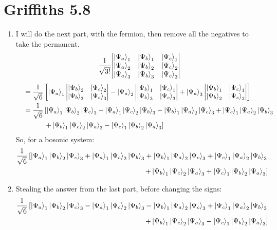 \documentclass[11pt]{article}
\begin{document}
\newpage

\section*{Griffiths 5.8}
\begin{enumerate}[label=\alph*)]
\addtocounter{enumi}{1}
\item I will do the next part, with the fermion, then remove all the negatives to take the permanent.
\[\frac{1}{\sqrt{3!}}\mqty|\ket{\Psi_a}_1 & \ket{\Psi_b}_1 & \ket{\Psi_c}_1 \\ \ket{\Psi_a}_2 & \ket{\Psi_b}_2 & \ket{\Psi_c}_2 \\ \ket{\Psi_a}_3 & \ket{\Psi_b}_3 & \ket{\Psi_c}_3|\]
\begin{align*}
\quad & = \frac{1}{\sqrt{6}}\left[\ket{\Psi_a}_1 \mqty|\ket{\Psi_b}_2 & \ket{\Psi_c}_2 \\ \ket{\Psi_b}_3 & \ket{\Psi_c}_3| - \ket{\Psi_a}_2 \mqty|\ket{\Psi_b}_1 & \ket{\Psi_c}_1 \\ \ket{\Psi_b}_3 & \ket{\Psi_c}_3| + \ket{\Psi_a}_3 \mqty|\ket{\Psi_b}_1 & \ket{\Psi_c}_1 \\ \ket{\Psi_b}_2 & \ket{\Psi_c}_2|\right]\\
& = \frac{1}{\sqrt{6}}\left[\ket{\Psi_a}_1 \ket{\Psi_b}_2\ket{\Psi_c}_3 - \ket{\Psi_a}_1\ket{\Psi_c}_2\ket{\Psi_b}_3 - \ket{\Psi_b}_1\ket{\Psi_a}_2\ket{\Psi_c}_3 + \ket{\Psi_c}_1\ket{\Psi_a}_2\ket{\Psi_b}_3\right. \\
& \hspace{3em}\left.+ \ket{\Psi_b}_1\ket{\Psi_c}_2\ket{\Psi_a}_3 - \ket{\Psi_c}_1\ket{\Psi_b}_2\ket{\Psi_a}_3\right]
\end{align*}
So, for a bosonic system: 
\begin{align*}
\frac{1}{\sqrt{6}}\left[\ket{\Psi_a}_1 \ket{\Psi_b}_2\ket{\Psi_c}_3 + \ket{\Psi_a}_1\ket{\Psi_c}_2\ket{\Psi_b}_3 + \ket{\Psi_b}_1\ket{\Psi_a}_2\ket{\Psi_c}_3 + \ket{\Psi_c}_1\ket{\Psi_a}_2\ket{\Psi_b}_3\right. \\
\hspace{3em}\left.+ \ket{\Psi_b}_1\ket{\Psi_c}_2\ket{\Psi_a}_3 + \ket{\Psi_c}_1\ket{\Psi_b}_2\ket{\Psi_a}_3\right]
\end{align*}
\item Stealing the answer from the last part, before changing the signs:
\begin{align*}
 \frac{1}{\sqrt{6}}\left[\ket{\Psi_a}_1 \ket{\Psi_b}_2\ket{\Psi_c}_3 - \ket{\Psi_a}_1\ket{\Psi_c}_2\ket{\Psi_b}_3 - \ket{\Psi_b}_1\ket{\Psi_a}_2\ket{\Psi_c}_3 + \ket{\Psi_c}_1\ket{\Psi_a}_2\ket{\Psi_b}_3\right. \\
\hspace{3em}\left.+ \ket{\Psi_b}_1\ket{\Psi_c}_2\ket{\Psi_a}_3 - \ket{\Psi_c}_1\ket{\Psi_b}_2\ket{\Psi_a}_3\right]
\end{align*}
\end{enumerate}
\end{document}
